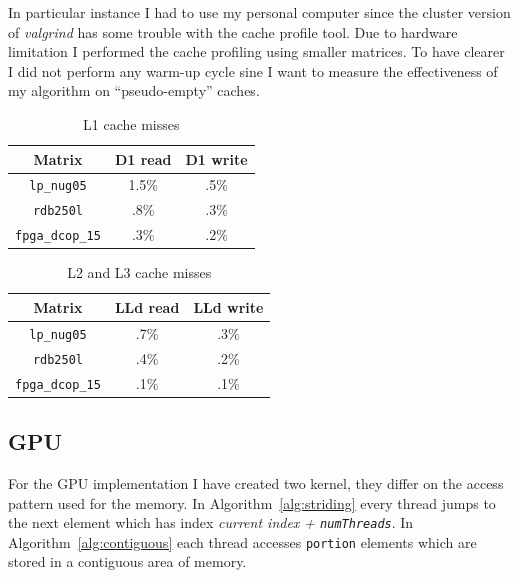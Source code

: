 \documentclass[conference]{IEEEtran}
\begin{document}
In particular instance I had to use my personal computer since the cluster version of \emph{valgrind} has some trouble with the cache profile tool. Due to hardware limitation I performed the cache profiling using smaller matrices. To have clearer I did not perform any warm-up cycle sine I want to measure the effectiveness of my algorithm on ``pseudo-empty'' caches.

\begin{table}[h]
  \centering
    \begin{tabular}{c|c c}
      \toprule
      Matrix & D1 read & D1 write\\
      \midrule
      \texttt{lp\_nug05} & 1.5\% & .5\%\\
      \texttt{rdb250l} & .8\% & .3\%\\
      \texttt{fpga\_dcop\_15} & .3\% & .2\%\\
      \bottomrule
    \end{tabular}
  \vspace{.5em}
  
  \caption{L1 cache misses}
  \label{tab:L1miss}
\end{table}

\begin{table}[h]
  \centering
    \begin{tabular}{c|c c}
      \toprule
      Matrix & LLd read & LLd write\\
      \midrule
      \texttt{lp\_nug05} & .7\% & .3\%\\
      \texttt{rdb250l} & .4\% & .2\%\\
      \texttt{fpga\_dcop\_15} & .1\% & .1\%\\
      \bottomrule
    \end{tabular}
  \vspace{.5em}
  
  \caption{L2 and L3 cache misses}
  \label{tab:L2L3miss}
\end{table}

\subsection{GPU}

For the GPU implementation I have created two kernel, they differ on the access pattern used for the memory. In Algorithm~\ref{alg:striding} every thread jumps to the next element which has index \emph{current index + \texttt{numThreads}}. In Algorithm~\ref{alg:contiguous} each thread accesses \texttt{portion} elements which are stored in a contiguous area of memory.
\end{document}
